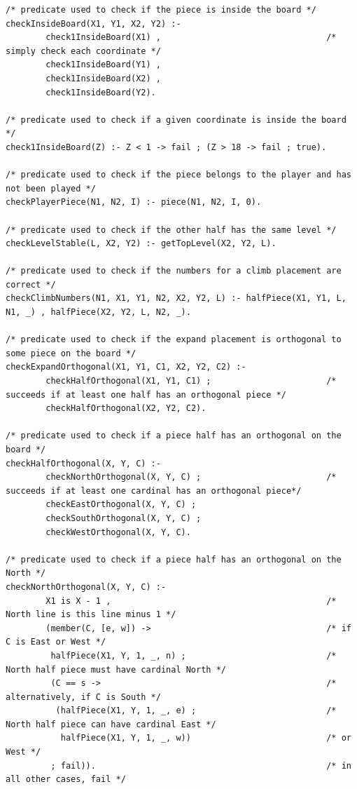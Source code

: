 \documentclass[a4paper]{article}
\begin{document}
\begin{lstlisting}
/* predicate used to check if the piece is inside the board */
checkInsideBoard(X1, Y1, X2, Y2) :- 
        check1InsideBoard(X1) ,                                 /* simply check each coordinate */
        check1InsideBoard(Y1) , 
        check1InsideBoard(X2) , 
        check1InsideBoard(Y2).

/* predicate used to check if a given coordinate is inside the board */
check1InsideBoard(Z) :- Z < 1 -> fail ; (Z > 18 -> fail ; true).

/* predicate used to check if the piece belongs to the player and has not been played */
checkPlayerPiece(N1, N2, I) :- piece(N1, N2, I, 0).

/* predicate used to check if the other half has the same level */
checkLevelStable(L, X2, Y2) :- getTopLevel(X2, Y2, L).

/* predicate used to check if the numbers for a climb placement are correct */
checkClimbNumbers(N1, X1, Y1, N2, X2, Y2, L) :- halfPiece(X1, Y1, L, N1, _) , halfPiece(X2, Y2, L, N2, _).

/* predicate used to check if the expand placement is orthogonal to some piece on the board */
checkExpandOrthogonal(X1, Y1, C1, X2, Y2, C2) :- 
        checkHalfOrthogonal(X1, Y1, C1) ;                       /* succeeds if at least one half has an orthogonal piece */
        checkHalfOrthogonal(X2, Y2, C2).

/* predicate used to check if a piece half has an orthogonal on the board */
checkHalfOrthogonal(X, Y, C) :- 
        checkNorthOrthogonal(X, Y, C) ;                         /* succeeds if at least one cardinal has an orthogonal piece*/
        checkEastOrthogonal(X, Y, C) ; 
        checkSouthOrthogonal(X, Y, C) ; 
        checkWestOrthogonal(X, Y, C).

/* predicate used to check if a piece half has an orthogonal on the North */
checkNorthOrthogonal(X, Y, C) :-
        X1 is X - 1 ,                                           /* North line is this line minus 1 */
        (member(C, [e, w]) ->                                   /* if C is East or West */
         halfPiece(X1, Y, 1, _, n) ;                            /* North half piece must have cardinal North */
         (C == s ->                                             /* alternatively, if C is South */
          (halfPiece(X1, Y, 1, _, e) ;                          /* North half piece can have cardinal East */
           halfPiece(X1, Y, 1, _, w))                           /* or West */
         ; fail)).                                              /* in all other cases, fail */


\end{lstlisting}
\end{document}
